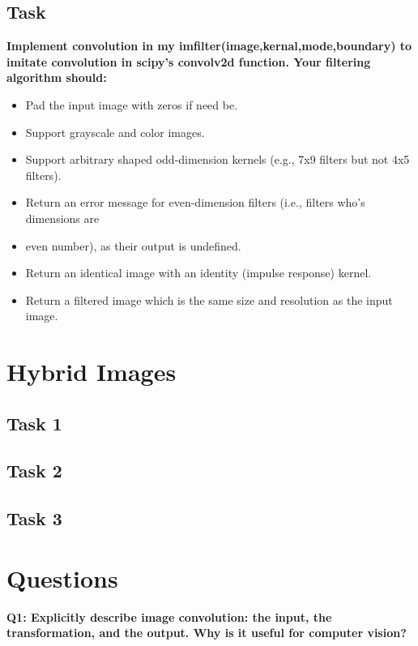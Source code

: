 \documentclass[12pt]{article}
\begin{document}
\subsection{Task}
\textbf{Implement convolution in my imfilter(image,kernal,mode,boundary)
to imitate convolution in scipy’s convolv2d function. Your filtering algorithm should:}
\begin{itemize}
  \item Pad the input image with zeros if need be.
  \item Support grayscale and color images.
  \item Support arbitrary shaped odd-dimension kernels (e.g., 7x9 filters but not 4x5 filters).
  \item Return an error message for even-dimension filters (i.e., filters who’s dimensions are
  \item even number), as their output is undefined.
  \item Return an identical image with an identity (impulse response) kernel.
  \item Return a filtered image which is the same size and resolution as the input image.
\end{itemize}




\section{Hybrid Images}

\subsection{Task 1}

\subsection{Task 2}

\subsection{Task 3}


\section{Questions}
\textbf{Q1: Explicitly describe image convolution: the input, the transformation, and the output.
Why is it useful for computer vision?}
\end{document}

